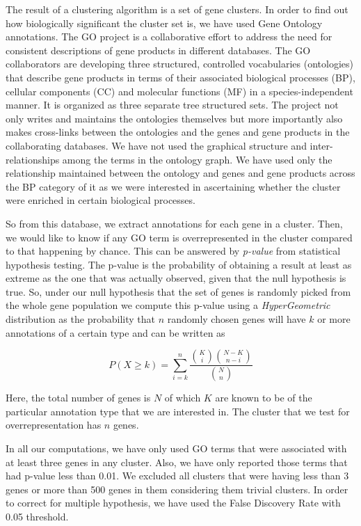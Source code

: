 The result of a clustering algorithm is a set of gene clusters. In order to find out how biologically significant the cluster set is, we have used Gene Ontology \citep{GO} annotations. The GO  project is a collaborative effort to address the need for consistent descriptions of gene products in different databases. The GO collaborators are developing three structured, controlled vocabularies (ontologies) that describe gene products in terms of their associated biological processes (BP), cellular components (CC) and molecular functions (MF) in a species-independent manner. It is organized as three separate tree structured sets. The project not only writes and maintains the ontologies themselves but more importantly also makes cross-links between the ontologies and the genes and gene products in the collaborating databases. We have not used the graphical structure and inter-relationships among the terms in the ontology graph. We have used only the relationship maintained between the ontology and genes and gene products across the BP category of it as we were interested in ascertaining whether the cluster were enriched in certain biological processes.

So from this database, we extract annotations for each gene in a cluster. Then, we would like to know if any GO term is  overrepresented in the cluster compared to that happening by chance. This can be answered by \textit{p-value} from statistical hypothesis testing. The p-value is the probability of obtaining a result at least as extreme as the one that was actually observed, given that the null hypothesis is true. So, under our null hypothesis that the set of genes is randomly picked from the whole gene population we compute this p-value using a \textit{HyperGeometric} distribution as the probability that $n$ randomly chosen genes will have $k$ or more annotations of a certain type and can be written as

\[
P(X \geq k) = \sum_{i=k}^{n} \frac{\binom{K}{i} \binom{N-K}{n-i}}{\binom {N}{n}}
\]
 
Here, the total number of genes is $N$ of which $K$ are known to be of the particular annotation type that we are interested in. The cluster that we test for overrepresentation has $n$ genes.

In all our computations, we have only used GO terms that were associated with at least three genes in any cluster. Also, we have only reported those terms that had p-value less than 0.01. We excluded all clusters that were having less than 3 genes or more than 500 genes in them considering them trivial clusters. In order to correct for multiple hypothesis, we have used the False Discovery Rate with 0.05 threshold.  